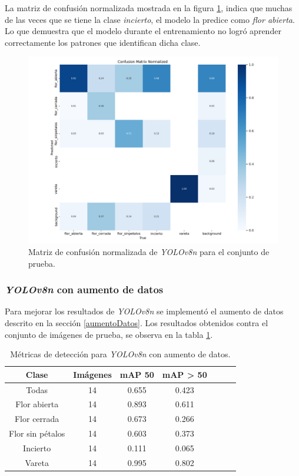 La matriz de confusión normalizada mostrada en la figura \ref{fig:cfmatriznorm}, indica que muchas de las veces que se tiene la clase \textit{incierto}, el modelo la predice como \textit{flor abierta}. Lo que demuestra que el modelo durante el entrenamiento no logró aprender correctamente los patrones que identifican dicha clase.

\begin{figure}[ht]
	\centering
	\includegraphics[scale=0.52]{./Figures/CFMatrixnorm.png}
	\caption{Matriz de confusión normalizada de \textit{YOLOv8n} para el conjunto de prueba.}
	\label{fig:cfmatriznorm}
\end{figure}

\subsubsection{\textit{YOLOv8n} con aumento de datos}
\label{YOLOv8n con aumento de dato}

Para mejorar los resultados de \textit{YOLOv8n} se implementó el aumento de datos descrito en la sección \ref{aumentoDatos}. Los resultados obtenidos contra el conjunto de imágenes de prueba, se observa en la tabla \ref{tab:resultadosYoloConAug}.

\begin{table}[h]
	\centering
	\caption{Métricas de detección para \textit{YOLOv8n} con aumento de datos.}
	\begin{tabular}{c c c c c c c}    
		\toprule
		\textbf{Clase}&\textbf{Imágenes}&\textbf{mAP 50}&\textbf{mAP > 50}\\
		\midrule
		Todas & 14 & 0.655 & 0.423\\
		Flor abierta & 14 & 0.893 & 0.611 \\
		Flor cerrada & 14 & 0.673 & 0.266 \\
		Flor sin pétalos & 14 & 0.603 & 0.373 \\
		Incierto & 14 & 0.111 & 0.065 \\
		Vareta & 14 & 0.995 & 0.802 \\		
		\bottomrule
		\hline
	\end{tabular}
	\label{tab:resultadosYoloConAug}
\end{table}

